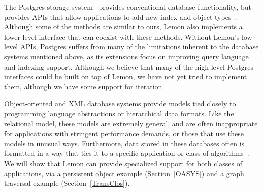 \documentclass[10pt,letterpaper,twocolumn,english]{article}
\newcommand{\yad}{Lemon\xspace}
\begin{document}
The Postgres storage system~\cite{postgres} provides conventional
database functionality, but provides APIs that allow applications to 
add new index and object types~\cite{newTypes}.  Although some of the methods are
similar to ours, \yad also implements a lower-level
interface that can coexist with these methods.  Without \yad's
low-level APIs, Postgres suffers from many of the limitations inherent
to the database systems mentioned above, as its extensions focus on
improving
query language and indexing support.
Although we
believe that many of the high-level Postgres interfaces could be built
on top of \yad, we have not yet tried to implement them, although
we have some support for iteration.

Object-oriented and XML database systems provide models tied closely
to programming language abstractions or hierarchical data formats.
Like the relational model, these models are extremely general, and are
often inappropriate for applications with stringent performance
demands, or those that use  these models in unusual ways.  Furthermore, data stored in these databases
often is formatted in a way that ties it to a specific application or
class of algorithms~\cite{lamb}.  We will show that \yad can provide 
specialized support for both classes of applications, via a persistent 
object example (Section~\ref{OASYS}) and a graph traversal example 
(Section~\ref{TransClos}).

\end{document}
